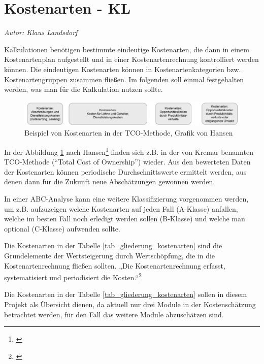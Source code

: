 \section{Kostenarten - KL}
\textit{Autor: Klaus Landsdorf}

\label{section_kostenarten}
Kalkulationen benötigen bestimmte eindeutige Kostenarten, die dann in einem Kostenartenplan aufgestellt und in einer Kostenartenrechnung kontrolliert werden können. Die eindeutigen Kostenarten können in Kostenartenkategorien bzw. Kostenartengruppen zusammen fließen.  Im folgenden soll einmal festgehalten werden, was man für die Kalkulation nutzen sollte.

\begin{figure}[h!]
	\centering
	\includegraphics[width=\textwidth]{kapitel/gruppe4_2/bilder/beispiel_kostenarten_TCO}
	\caption{Beispiel von Kostenarten in der TCO-Methode, Grafik von Hansen}
	\label{fig_kostenarten_TCO}
\end{figure}

In der Abbildung \ref{fig_kostenarten_TCO} nach Hansen\footnote{\cite{hansen_business_2009}} finden sich z.B. in der von Krcmar benannten TCO-Methode (“Total Cost of Ownership”) wieder. Aus den bewerteten Daten der Kostenarten können periodische Durchschnittswerte ermittelt werden, aus denen dann für die Zukunft neue Abschätzungen gewonnen werden.

In einer ABC-Analyse kann eine weitere Klassifizierung vorgenommen werden, um z.B. aufzuzeigen welche Kostenarten auf jeden Fall (A-Klasse) anfallen, welche im besten Fall noch erledigt werden sollen (B-Klasse) und welche man optional (C-Klasse) aufwenden sollte.

Die Kostenarten in der Tabelle \ref{tab_gliederung_kostenarten} sind die Grundelemente der Wertsteigerung durch Wertschöpfung, die in die Kostenartenrechnung fließen sollten. „Die Kostenartenrechnung erfasst, systematisiert und periodisiert die Kosten.“\footnote{\cite{reim_erfolgsrechnung_2015}} 

Die Kostenarten in der Tabelle \ref{tab_gliederung_kostenarten} sollen in diesem Projekt als Übersicht dienen, da aktuell nur drei Module in der Kostenschätzung betrachtet werden, für den Fall das weitere Module abzuschätzen sind.

